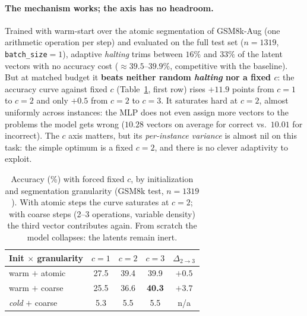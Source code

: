 \documentclass[11pt]{article}
\begin{document}
\paragraph{The mechanism works; the axis has no headroom.} Trained with warm-start over the atomic segmentation of GSM8k-Aug (one arithmetic operation per step) and evaluated on the full test set ($n{=}1319$, \texttt{batch\_size}$=1$), adaptive \textit{halting} trims between $16\%$ and $33\%$ of the latent vectors with no accuracy cost ($\approx 39.5$--$39.9\%$, competitive with the baseline). But at matched budget it \textbf{beats neither random \textit{halting} nor a fixed $c$}: the accuracy curve against fixed $c$ (Table~\ref{tab:opcionb}, first row) rises $+11.9$ points from $c{=}1$ to $c{=}2$ and only $+0.5$ from $c{=}2$ to $c{=}3$. It saturates hard at $c{=}2$, almost uniformly across instances: the MLP does not even assign more vectors to the problems the model gets wrong ($10.28$ vectors on average for correct vs.\ $10.01$ for incorrect). The $c$ axis matters, but its \emph{per-instance variance} is almost nil on this task: the simple optimum is a fixed $c{=}2$, and there is no clever adaptivity to exploit.

\begin{table}[t]
  \centering
  \small
  \begin{tabular}{lcccc}
    \toprule
    \textbf{Init $\times$ granularity} & $c{=}1$ & $c{=}2$ & $c{=}3$ & $\Delta_{2\rightarrow3}$ \\
    \midrule
    warm $+$ atomic & 27.5 & 39.4 & 39.9 & $+0.5$ \\
    warm $+$ coarse & 25.5 & 36.6 & \textbf{40.3} & $+3.7$ \\
    \textit{cold} $+$ coarse & 5.3 & 5.5 & 5.5 & n/a \\
    \bottomrule
  \end{tabular}
  \caption{Accuracy (\%) with forced fixed $c$, by initialization and segmentation granularity (GSM8k test, $n{=}1319$). With atomic steps the curve saturates at $c{=}2$; with coarse steps (2--3 operations, variable density) the third vector contributes again. From scratch the model collapses: the latents remain inert.}
  \label{tab:opcionb}
\end{table}
\end{document}
